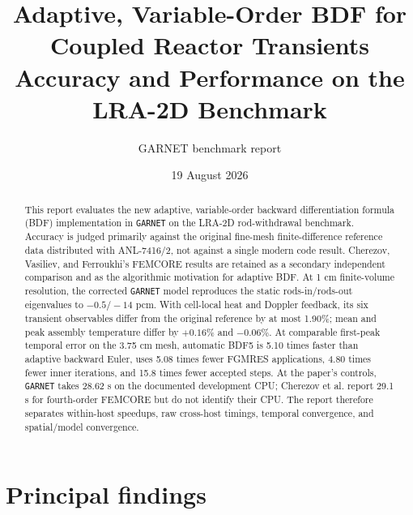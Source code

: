 \documentclass[10pt]{article}
\title{\textbf{Adaptive, Variable-Order BDF for Coupled Reactor Transients}\\
\large Accuracy and Performance on the LRA-2D Benchmark}
\author{GARNET benchmark report}
\date{19 August 2026}
\newcommand{\garnet}{\texttt{GARNET}}
\begin{document}
\maketitle

\begin{abstract}
This report evaluates the new adaptive, variable-order backward differentiation
formula (BDF) implementation in \garnet{} on the LRA-2D rod-withdrawal
benchmark. Accuracy is judged primarily against the original fine-mesh
finite-difference reference data distributed with ANL-7416/2, not against a
single modern code result. Cherezov, Vasiliev, and Ferroukhi's FEMCORE results
are retained as a secondary independent comparison and as the algorithmic
motivation for adaptive BDF. At 1 cm finite-volume resolution, the corrected
\garnet{} model reproduces the static rods-in/rods-out eigenvalues to
$-0.5/-14$ pcm. With cell-local heat and Doppler feedback, its six transient
observables differ from the original reference by at most 1.90\%; mean and peak
assembly temperature differ by $+0.16\%$ and $-0.06\%$. At comparable
first-peak temporal error on the 3.75 cm mesh, automatic BDF5 is 5.10 times
faster than adaptive backward Euler, uses 5.08 times fewer FGMRES applications,
4.80 times fewer inner iterations, and 15.8 times fewer accepted steps. At the
paper's controls, \garnet{} takes 28.62 s on the documented development CPU;
Cherezov et al. report 29.1 s for fourth-order FEMCORE but do not identify
their CPU. The report therefore separates within-host speedups, raw cross-host
timings, temporal convergence, and spatial/model convergence.
\end{abstract}

\section*{Principal findings}
\end{document}
